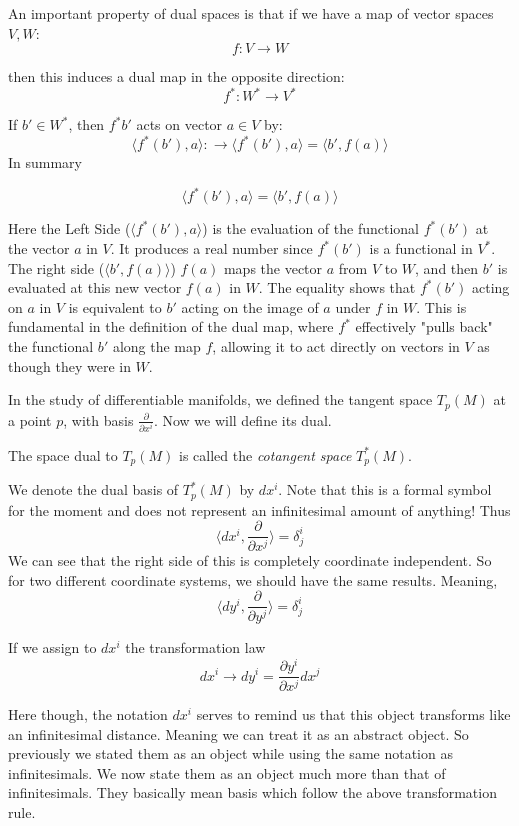 \documentclass{article}
\begin{document}
An important property of dual spaces is that if we have a map of vector spaces \( V, W \):
\[
f : V \to W
\]

then this induces a dual map in the opposite direction:
\[
f^* : W^* \to V^*
\]

If \( b' \in W^* \), then \( f^*b' \) acts on vector \( a \in V \) by:
\[
\langle f^*(b'), a \rangle: \to \langle f^*(b'), a \rangle = \langle b', f(a) \rangle
\]
In summary 

  \[
  \langle f^*(b'), a \rangle = \langle b', f(a) \rangle
  \]

Here the Left Side (\(\langle f^*(b'), a \rangle\)) is the evaluation of the functional \( f^*(b') \) at the vector \( a \) in \( V \). It produces a real number since \( f^*(b') \) is a functional in \( V^* \).
The right side (\(\langle b', f(a) \rangle\)) \( f(a) \) maps the vector \( a \) from \( V \) to \( W \), and then \( b' \) is evaluated at this new vector \( f(a) \) in \( W \). The equality shows that \( f^*(b') \) acting on \( a \) in \( V \) is equivalent to \( b' \) acting on the image of \( a \) under \( f \) in \( W \). This is fundamental in the definition of the dual map, where \( f^* \) effectively "pulls back" the functional \( b' \) along the map \( f \), allowing it to act directly on vectors in \( V \) as though they were in \( W \).

In the study of differentiable manifolds, we defined the tangent space \(T_p(M)\) at a point \(p\), with basis \(\frac{\partial}{\partial x^i}\). Now we will define its dual.

\begin{theorem}
The space dual to \(T_p(M)\) is called the \textit{cotangent space} \(T^*_p(M)\).    
\end{theorem}

We denote the dual basis of \(T^*_p(M)\) by \(dx^i\). Note that this is a formal symbol for the moment and does not represent an infinitesimal amount of anything! Thus
\[
\langle dx^i, \frac{\partial}{\partial x^j} \rangle = \delta^i_j
\]
We can see that the right side of this is completely coordinate independent. So for two different coordinate systems, we should have the same results. Meaning, 
 \[
\langle dy^i, \frac{\partial}{\partial y^j} \rangle = \delta^i_j
\]

If we assign to \(dx^i\) the transformation law
\[
dx^i \to dy^i = \frac{\partial y^i}{\partial x^j} dx^j
\]

Here though, the notation \(dx^i\) serves to remind us that this object transforms like an infinitesimal distance. Meaning we can treat it as an abstract object. So previously we stated them as an object while using the same notation as infinitesimals. We now state them as an object much more than that of infinitesimals. They basically mean basis which follow the above transformation rule. 
\end{document}
